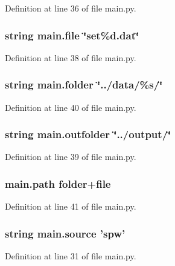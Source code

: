 Definition at line 36 of file main.\-py.

\hypertarget{namespacemain_aecd6226a151c6d5a3cf8e14eff8ab1ab}{
\subsubsection[{file}]{\setlength{\rightskip}{0pt plus 5cm}string main.\-file \char`\"{}set\%d.\-dat\char`\"{}}}\label{namespacemain_aecd6226a151c6d5a3cf8e14eff8ab1ab}


Definition at line 38 of file main.\-py.

\hypertarget{namespacemain_a420838a5c4271000147fb1071b83c027}{
\subsubsection[{folder}]{\setlength{\rightskip}{0pt plus 5cm}string main.\-folder \char`\"{}../data/\%s/\char`\"{}}}\label{namespacemain_a420838a5c4271000147fb1071b83c027}


Definition at line 40 of file main.\-py.

\hypertarget{namespacemain_a2daf9a8b215310e0e292637326976e40}{
\subsubsection[{outfolder}]{\setlength{\rightskip}{0pt plus 5cm}string main.\-outfolder \char`\"{}../output/\char`\"{}}}\label{namespacemain_a2daf9a8b215310e0e292637326976e40}


Definition at line 39 of file main.\-py.

\hypertarget{namespacemain_a2a2f58348e4a36c9b004f7eacab52fa2}{
\subsubsection[{path}]{\setlength{\rightskip}{0pt plus 5cm}main.\-path {\bf folder}+{\bf file}}}\label{namespacemain_a2a2f58348e4a36c9b004f7eacab52fa2}


Definition at line 41 of file main.\-py.

\hypertarget{namespacemain_a75667a1170a74674aa6f7fa04dca3f51}{
\subsubsection[{source}]{\setlength{\rightskip}{0pt plus 5cm}string main.\-source 'spw'}}\label{namespacemain_a75667a1170a74674aa6f7fa04dca3f51}


Definition at line 31 of file main.\-py.


